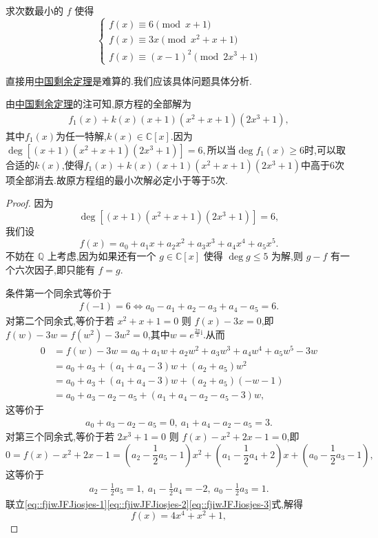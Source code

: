 \documentclass[../../main.tex]{subfiles}%
\begin{document}
\begin{example}
求次数最小的 \( f \) 使得
\[
\begin{cases}
f(x) \equiv 6 \pmod{x + 1} \\
f(x) \equiv 3x \pmod{x^2 + x + 1} \\
f(x) \equiv (x - 1)^2 \pmod{2x^3 + 1}
\end{cases}
\]
\end{example}
\begin{remark}
直接用\hyperref[theorem:中国剩余定理(多项式版)]{中国剩余定理}是难算的.我们应该具体问题具体分析.
\end{remark}
\begin{remark}
由\hyperref[theorem:中国剩余定理(多项式版)]{中国剩余定理}的注可知,原方程的全部解为
\begin{align*}
f_1\left( x \right) +k\left( x \right) \left( x+1 \right) \left( x^2+x+1 \right) \left( 2x^3+1 \right) ,
\end{align*}
其中$f_1(x)$为任一特解,$k(x)\in \mathbb{C}[x]$.因为$\deg\left[(x + 1)(x^2 + x + 1)(2x^3 + 1)\right] = 6,$所以当$\deg f_1(x)\geqslant  6$时,可以取合适的$k(x)$,使得$f_1\left( x \right) +k\left( x \right) \left( x+1 \right) \left( x^2+x+1 \right) \left( 2x^3+1 \right)$中高于6次项全部消去.故原方程组的最小次解必定小于等于5次.
\end{remark}
\begin{proof}
因为
\[
\deg\left[(x + 1)(x^2 + x + 1)(2x^3 + 1)\right] = 6,
\]
我们设
\[
f(x) = a_0 + a_1x + a_2x^2 + a_3x^3 + a_4x^4 + a_5x^5.
\]
不妨在 \( \mathbb{Q} \) 上考虑,因为如果还有一个 \( g \in \mathbb{C}[x] \) 使得 \( \deg g \leqslant  5 \) 为解,则 \( g - f \) 有一个六次因子,即只能有 \( f = g \).

条件第一个同余式等价于
\begin{align}\label{eq::fjiwJFJiosjes-1}
f(-1) = 6 \iff a_0 - a_1 + a_2 - a_3 + a_4 - a_5 = 6.
\end{align}
对第二个同余式,等价于若 \( x^2 + x + 1 = 0 \) 则 \( f(x) - 3x = 0 \),即$f(w)-3w=f(w^2)-3w^2=0$,其中$w=e^{\frac{2\pi}{3}\mathrm{i}}$.从而
\begin{align*}
0&=f(w)-3w=a_0+a_1w+a_2w^2+a_3w^3+a_4w^4+a_5w^5-3w
\\
&=a_0+a_3+(a_1+a_4-3)w+(a_2+a_5)w^2
\\
&=a_0+a_3+(a_1+a_4-3)w+(a_2+a_5)\left( -w-1 \right) 
\\
&=a_0+a_3-a_2-a_5+(a_1+a_4-a_2-a_5-3)w,
\end{align*}
这等价于
\begin{align}
a_0 + a_3 - a_2 - a_5 = 0,\ a_1 + a_4 - a_2 - a_5 = 3.\label{eq::fjiwJFJiosjes-2}
\end{align}
对第三个同余式,等价于若 \( 2x^3 + 1 = 0 \) 则 \( f(x) - x^2 + 2x - 1 = 0 \),即
\[
0=f(x) - x^2 + 2x - 1 = \left(a_2 - \frac{1}{2}a_5 - 1\right)x^2 + \left(a_1 - \frac{1}{2}a_4 + 2\right)x + \left(a_0 - \frac{1}{2}a_3 - 1\right),
\]
这等价于
\begin{align}
a_2 - \frac{1}{2}a_5 = 1,\ a_1 - \frac{1}{2}a_4 = -2,\ a_0 - \frac{1}{2}a_3 = 1.\label{eq::fjiwJFJiosjes-3}
\end{align}
联立\eqref{eq::fjiwJFJiosjes-1}\eqref{eq::fjiwJFJiosjes-2}\eqref{eq::fjiwJFJiosjes-3}式,解得
\[
f(x) = 4x^4 + x^2 + 1,
\]
\end{proof}
\end{document}

